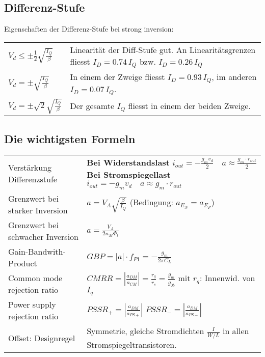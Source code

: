 \subsection{Differenz-Stufe}
Eigenschaften der Differenz-Stufe bei strong inversion:
\begin{table}[htbp]
	\centering
	\begin{tabularx}{0.7\linewidth}{lX}
		$V_d \leq \pm \frac{1}{2} \sqrt{\frac{I_Q}{\beta}}$ & Linearität der Diff-Stufe gut. An Linearitätsgrenzen fliesst $I_D = 0.74 \, I_Q$ bzw. $I_D = 0.26 \, I_Q$ \\
		$V_d = \pm \sqrt{\frac{I_Q}{\beta}}$ & In einem der Zweige fliesst $I_D = 0.93 \, I_Q$, im anderen \newline $I_D = 0.07 \, I_Q$. \\
		$V_d = \pm \sqrt{2} \sqrt{\frac{I_Q}{\beta}}$ & Der gesamte $I_Q$ fliesst in einem der beiden Zweige. \\
	\end{tabularx}
\end{table}

\subsection{Die wichtigsten Formeln}
\begin{tabular}{p{7cm}p{11cm}}
Verstärkung Differenzstufe &
\textbf{Bei Widerstandslast} $i_{out}=-\frac{g_mv_d}{2} \quad a\approx\frac{g_m\cdot r_{out}}{2}$ \newline
\textbf{Bei Stromspiegellast} $i_{out}=-g_mv_d \quad a\approx g_m\cdot r_{out}$
\\
Grenzwert bei starker Inversion & $a=V_A\sqrt{\frac{\beta}{I_Q}}$ (Bedingung:
$a_{E_N}=a_{E_P}$)\\
Grenzwert bei schwacher Inversion & $a=\frac{V_A}{2n_M\Phi_t}$\\
Gain-Bandwith-Product & $GBP=|a|\cdot f_{P1} = -\frac{g_m}{2\pi C_L}$ \\
Common mode rejection ratio & $CMRR=\left| \frac{a_{DM}}{a_{CM}}\right| = \frac{r_q}{r_s} = \frac{g_m}{g_{0b}}$ mit $r_q$: Innenwid. von $I_q$ \\
Power supply rejection ratio &
$PSSR_+ = \left| \frac{a_{DM}}{a_{PS+}}\right|$ \newline
$PSSR_- = \left| \frac{a_{DM}}{a_{PS-}}\right|$ \\
Offset: Designregel & Symmetrie, gleiche Stromdichten $\frac{I}{W/L}$ in
allen Stromspiegeltransistoren. \\
\end{tabular}

